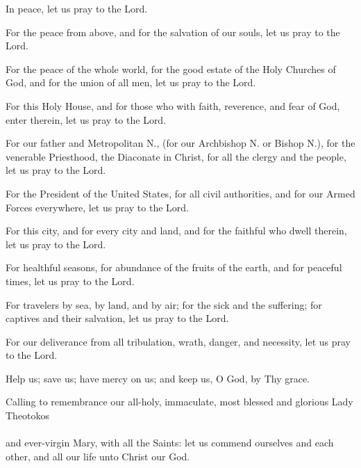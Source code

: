 \documentclass[twoside, letterpaper, 12pt]{report}
\begin{document}
\begin{deacon}
\item In peace, let us pray to the Lord.
\end{deacon}

\begin{deacon}
\item For the peace from above, and for the salvation of our souls,
    let us pray to the Lord.
\end{deacon}

\begin{deacon}
\item For the peace of the whole world, for the good estate of the Holy Churches of God,
    and for the union of all men, let us pray to the Lord.
\item For this Holy House, and for those who with faith, reverence, and fear of God,
    enter therein, let us pray to the Lord.
\item For our father and Metropolitan N., (for our Archbishop N. or Bishop N.),
    for the venerable Priesthood, the Diaconate in Christ,
    for all the clergy and the people, let us pray to the Lord.
\item  For the President of the United States, for all civil authorities,
    and for our Armed Forces everywhere, let us pray to the Lord.
\item For this city, and for every city and land, and for the faithful who dwell
    therein, let us pray to the Lord.
\item For healthful seasons, for abundance of the fruits of the earth,
    and for peaceful times, let us pray to the Lord.
\item For travelers by sea, by land, and by air; for the sick and the suffering;
    for captives and their salvation, let us pray to the Lord.
\item For our deliverance from all tribulation, wrath, danger, and necessity,
    let us pray to the Lord.
\item  Help us; save us; have mercy on us; and keep us, O God, by Thy grace.
\item Calling to remembrance our all-holy, immaculate, most blessed and glorious Lady Theotokos
    \\
    \\
    and ever-virgin Mary, with all the Saints: let us commend ourselves and
    each other, and all our life unto Christ our God.
\end{deacon}
\end{document}
